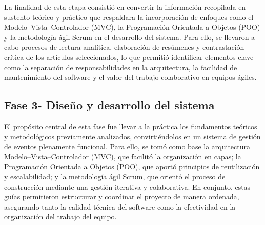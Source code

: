 La finalidad de esta etapa consistió en convertir la información recopilada en sustento teórico y práctico que respaldara la incorporación de enfoques como el Modelo–Vista–Controlador (MVC), la Programación Orientada a Objetos (POO) y la metodología ágil Scrum en el desarrollo del sistema. Para ello, se llevaron a cabo procesos de lectura analítica, elaboración de resúmenes y contrastación crítica de los artículos seleccionados, lo que permitió identificar elementos clave como la separación de responsabilidades en la arquitectura, la facilidad de mantenimiento del software y el valor del trabajo colaborativo en equipos ágiles.

\subsection{Fase 3- Diseño y desarrollo del sistema}

El propósito central de esta fase fue llevar a la práctica los fundamentos teóricos y metodológicos previamente analizados, convirtiéndolos en un sistema de gestión de eventos plenamente funcional. Para ello, se tomó como base la arquitectura Modelo–Vista–Controlador (MVC), que facilitó la organización en capas; la Programación Orientada a Objetos (POO), que aportó principios de reutilización y escalabilidad; y la metodología ágil Scrum, que orientó el proceso de construcción mediante una gestión iterativa y colaborativa. En conjunto, estas guías permitieron estructurar y coordinar el proyecto de manera ordenada, asegurando tanto la calidad técnica del software como la efectividad en la organización del trabajo del equipo.